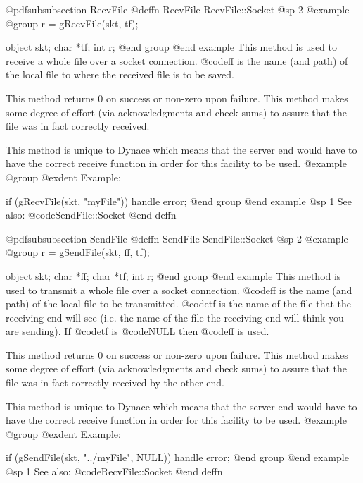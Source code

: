 @pdfsubsubsection {RecvFile}
@deffn {RecvFile} RecvFile::Socket
@sp 2
@example
@group
r = gRecvFile(skt, tf);

object  skt;
char    *tf;
int     r;
@end group
@end example
This method is used to receive a whole file over a socket connection.
@code{ff} is the name (and path) of the local file to where the received
file is to be saved.

This method returns 0 on success or non-zero upon failure.  This method
makes some degree of effort (via acknowledgments and check sums) to assure
that the file was in fact correctly received.

This method is unique to Dynace which means that the server end would
have to have the correct receive function in order for this facility
to be used.
@example
@group
@exdent Example:
 
if (gRecvFile(skt, "myFile"))
      handle error;
@end group
@end example
@sp 1
See also:  @code{SendFile::Socket}
@end deffn

















@pdfsubsubsection {SendFile}
@deffn {SendFile} SendFile::Socket
@sp 2
@example
@group
r = gSendFile(skt, ff, tf);

object  skt;
char    *ff;
char    *tf;
int     r;
@end group
@end example
This method is used to transmit a whole file over a socket connection.
@code{ff} is the name (and path) of the local file to be transmitted.
@code{tf} is the name of the file that the receiving end will see
(i.e. the name of the file the receiving end will think you are
sending).  If @code{tf} is @code{NULL} then @code{ff} is used.

This method returns 0 on success or non-zero upon failure.  This method
makes some degree of effort (via acknowledgments and check sums) to assure
that the file was in fact correctly received by the other end.

This method is unique to Dynace which means that the server end would
have to have the correct receive function in order for this facility
to be used.
@example
@group
@exdent Example:
 
if (gSendFile(skt, "../myFile", NULL))
      handle error;
@end group
@end example
@sp 1
See also:  @code{RecvFile::Socket}
@end deffn









